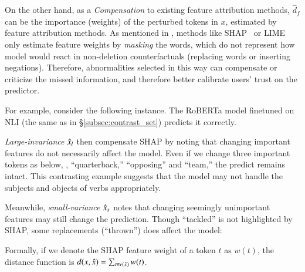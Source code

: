 On the other hand, as a \emph{Compensation} to existing feature attribution methods, $\hat{d}_f$ can be the importance (weights) of the perturbed tokens in $x$, estimated by feature attribution methods.
As mentioned in \wts{\S\ref{}}, methods like SHAP~\cite{} or LIME~\cite{} only estimate feature weights by \emph{masking} the words, which do not represent how model would react in non-deletion counterfactuals (replacing words or inserting negations).
Therefore, abnormalities selected in this way can  compensate or criticize the missed information, and therefore better calibrate users' trust on the predictor.


For example, consider the following \dnli instance. 
The RoBERTa model finetuned on NLI (the same as in \S\ref{subsec:contrast_set}) predicts it correctly.


\emph{Large-invariance} $\hat{x}_l$ then compensate SHAP by noting that changing important features do not necessarily affect the model.
Even if we change three important tokens as below, \ie, ``quarterback,'' ``opposing'' and ``team,'' the predict remains intact. 
This contrasting example suggests that the model may not handle the subjects and objects of verbs appropriately.


Meanwhile, \emph{small-variance} $\hat{x}_s$ notes that changing seemingly unimportant features may still change the prediction.
Though ``tackled'' is not highlighted by SHAP, some replacements (\eg ``thrown'') does affect the model:


Formally, if we denote the SHAP feature weight of a token $t$ as $w(t)$, the distance function is $d(x, \hat{x}) = \sum_{t \in r(\hat{x})} w(t)$.

